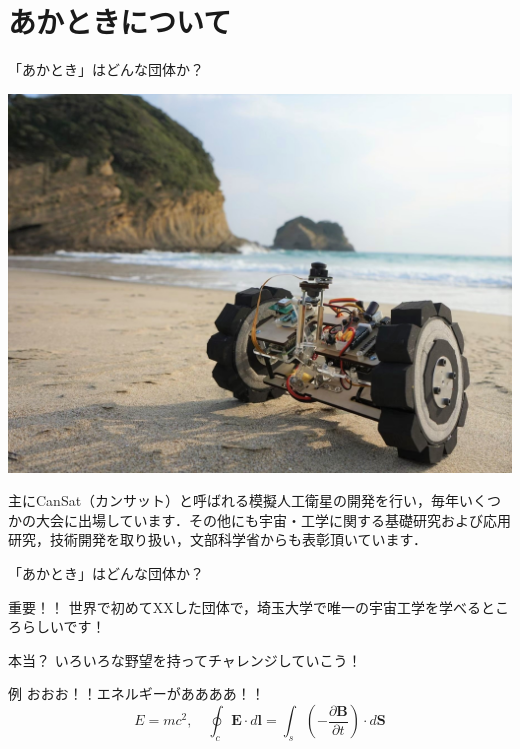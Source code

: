\documentclass[dvipdfmx, 11pt]{beamer}
\begin{document}
	\section{あかときについて}
	\begin{frame}{「あかとき」はどんな団体か？}
		\centering
		\begin{minipage}{0.45\linewidth}
			\includegraphics[width=0.8\linewidth]{cansat_sea}
		\end{minipage}
		\begin{minipage}{0.45\linewidth}
			主にCanSat（カンサット）と呼ばれる模擬人工衛星の開発を行い，毎年いくつかの大会に出場しています．その他にも宇宙・工学に関する基礎研究および応用研究，技術開発を取り扱い，文部科学省からも表彰頂いています．
		\end{minipage}
	\end{frame}
	
	\begin{frame}{「あかとき」はどんな団体か？}
		\begin{alertblock}{重要！！}
			世界で初めてXXした団体で，埼玉大学で唯一の宇宙工学を学べるところらしいです！
		\end{alertblock}
		\begin{block}{本当？}
			いろいろな野望を持ってチャレンジしていこう！
		\end{block}
		\begin{exampleblock}{例}
			おおお！！エネルギーがああああ！！
			\begin{equation}
				E = mc^2 , \quad \oint_c\mathbf E\cdot d\mathbf l=\int_s\left(-\frac{\partial\mathbf B}{\partial t}\right)\cdot d\mathbf S
			\end{equation}
		\end{exampleblock}
	\end{frame}
\end{document}
